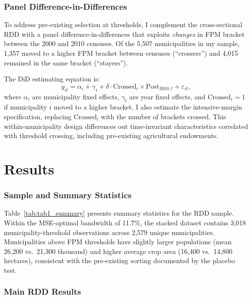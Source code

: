 \documentclass[12pt]{article}
\begin{document}
\subsubsection*{Panel Difference-in-Differences}

To address pre-existing selection at thresholds, I complement the cross-sectional RDD with a panel difference-in-differences that exploits \textit{changes} in FPM bracket between the 2000 and 2010 censuses. Of the 5,507 municipalities in my sample, 1,357 moved to a higher FPM bracket between censuses (``crossers'') and 4,015 remained in the same bracket (``stayers'').

The DiD estimating equation is:
\[
y_{it} = \alpha_i + \gamma_t + \delta \cdot \text{Crossed}_i \times \text{Post}_{2010,t} + \varepsilon_{it},
\]
where $\alpha_i$ are municipality fixed effects, $\gamma_t$ are year fixed effects, and $\text{Crossed}_i = 1$ if municipality $i$ moved to a higher bracket. I also estimate the intensive-margin specification, replacing $\text{Crossed}_i$ with the number of brackets crossed. This within-municipality design differences out time-invariant characteristics correlated with threshold crossing, including pre-existing agricultural endowments.

\section{Results}

\subsubsection*{Sample and Summary Statistics}

Table~\ref{tab:tab1_summary} presents summary statistics for the RDD sample. Within the MSE-optimal bandwidth of 11.7\%, the stacked dataset contains 3,018 municipality-threshold observations across 2,579 unique municipalities. Municipalities above FPM thresholds have slightly larger populations (mean 26,200 vs.\ 21,300 thousand) and higher average crop area (16,400 vs.\ 14,800 hectares), consistent with the pre-existing sorting documented by the placebo test.

\subsubsection*{Main RDD Results}
\end{document}
